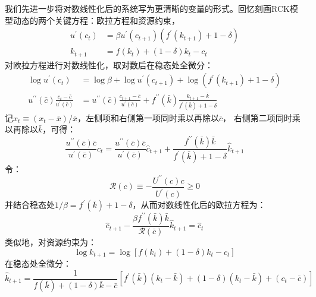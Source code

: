 我们先进一步将对数线性化后的系统写为更清晰的变量的形式。回忆刻画RCK模型动态的两个关键方程：欧拉方程和资源约束，
\begin{equation*}
    \begin{aligned}
        u^{\prime}(c_t) &= \beta u^{\prime}(c_{t+1})\left(f^{\prime}(k_{t+1})+1-\delta\right) \\
        k_{t+1} &= f(k_t) + (1 - \delta) k_t - c_t
    \end{aligned}
\end{equation*}
对欧拉方程进行对数线性化，取对数后在稳态处全微分：
\begin{equation*}
    \begin{aligned}
        \log u^{\prime}(c_t) &= \log \beta + 
            \log u^{\prime}(c_{t+1}) + \log \left(f^{\prime}(k_{t+1})+1-\delta\right)  \\
        u^{\prime\prime}(\bar{c})\frac{c_t-\bar{c}}{u^{\prime}(\bar{c})} &= 
            u^{\prime\prime}(\bar{c})\frac{c_{t+1}-\bar{c}}{u^{\prime}(\bar{c})}
            + f^{\prime\prime}(\bar{k})\frac{k_{t+1}-\bar{k}}{f^{\prime}(\bar{k})+1-\delta}
    \end{aligned}
\end{equation*}
记$\hat{x}_t \equiv (x_t-\bar{x}) / \bar{x}$，左侧项和右侧第一项同时乘以再除以$\bar{c}$，
右侧第二项同时乘以再除以$\bar{k}$，可得：
\begin{equation*}
    \frac{u^{\prime\prime}(\bar{c})\bar{c}}{u^{\prime}(\bar{c})} \hat{c}_t = 
        \frac{u^{\prime\prime}(\bar{c})\bar{c}}{u^{\prime}(\bar{c})} \hat{c}_{t+1}
        + \frac{f^{\prime\prime}(\bar{k})\bar{k}}{f^{\prime}(\bar{k})+1-\delta} \hat{k}_{t+1}
\end{equation*}
令：
\begin{equation*}
    \mathcal{R}(c) \equiv-\frac{U^{\prime \prime}(c) c}{U^{\prime}(c)} \geq 0
\end{equation*}
并结合稳态处$1/\beta = f^{\prime}(\bar{k})+1-\delta$，从而对数线性化后的欧拉方程为：
\begin{equation}
     \hat{c}_{t+1} - \frac{\beta f^{\prime\prime}(\bar{k}) \bar{k}}{\mathcal{R}(\bar{c})}\hat{k}_{t+1}= \hat{c}_t
\end{equation}
类似地，对资源约束为：
\begin{equation*}
    \log k_{t+1} = \log \left[f(k_t) + (1-\delta)k_t - c_t\right]
\end{equation*}
在稳态处全微分：
\begin{equation*}
    \hat{k}_{t+1} = \frac{1}{f(\bar{k})+(1-\delta)\bar{k}-\bar{c}}
        \left[f^{\prime}(\bar{k})(k_t-\bar{k}) + (1-\delta)(k_t-\bar{k}) + (c_t-\bar{c})\right]
\end{equation*}
